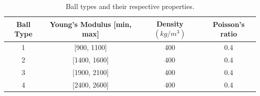 \begin{table}[ht]
  \centering
  \setlength{\tabcolsep}{6pt}
  \setlength{\abovecaptionskip}{6pt}
  \begin{tabular}{@{}cccc@{}}
      \toprule
      \textbf{Ball Type} & \textbf{Young's Modulus [min, max]} & \textbf{Density $(kg/m^3)$} & \textbf{Poisson's ratio} \\ 
      \midrule
      1 & [900, 1100] & 400 & 0.4 \\ 
      2 & [1400, 1600] & 400 & 0.4 \\ 
      3 & [1900, 2100] & 400 & 0.4 \\ 
      4 & [2400, 2600] & 400 & 0.4 \\ 
      \bottomrule
  \end{tabular}
  \caption{Ball types and their respective properties.}
  \label{tab:ball_classes}
\end{table}